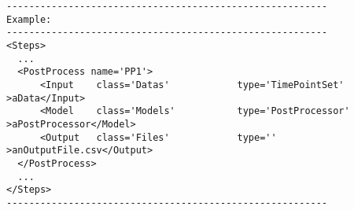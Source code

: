 \begin{lstlisting}[style=XML]
---------------------------------------------------------
Example:
---------------------------------------------------------
<Steps>
  ...
  <PostProcess name='PP1'>
      <Input    class='Datas'            type='TimePointSet'    >aData</Input>
      <Model    class='Models'           type='PostProcessor' >aPostProcessor</Model>
      <Output   class='Files'            type=''                         >anOutputFile.csv</Output>
  </PostProcess>
  ...
</Steps>
---------------------------------------------------------
\end{lstlisting}